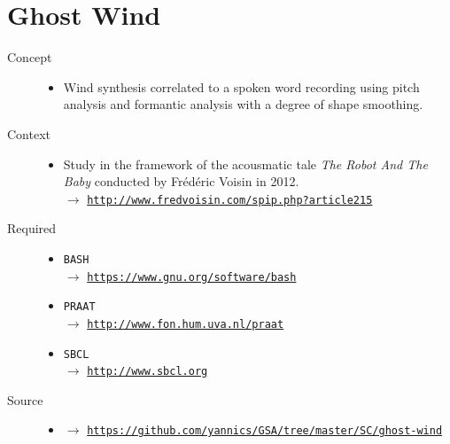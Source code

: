 

\section*{Ghost Wind}

\thispagestyle{empty}

\bigskip

\begin{description}
\item[Concept] \hfill 
\begin{itemize}
\item[] Wind synthesis correlated to a spoken word recording using pitch analysis and formantic analysis with a degree of shape smoothing.
\end{itemize}
\bigskip
\item[Context] \hfill 
\begin{itemize}
\item[] Study in the framework of the acousmatic tale \textit{The Robot And The Baby} conducted by Fr\'{e}d\'{e}ric Voisin in 2012. \\
$\rightarrow$ \href{http://www.fredvoisin.com/spip.php?article215}{\texttt{\small http://www.fredvoisin.com/spip.php?article215}}
\end{itemize}
\bigskip
\item[Required] \hfill 
\begin{itemize}
\setlength\itemsep{1em}
\item[] \texttt{BASH} \\ $\rightarrow$ \href{https://www.gnu.org/software/bash}{\texttt{\small https://www.gnu.org/software/bash}}
\item[] \texttt{PRAAT} \\ $\rightarrow$ \href{http://www.fon.hum.uva.nl/praat}{\texttt{\small http://www.fon.hum.uva.nl/praat}} 
\item[] \texttt{SBCL} \\ $\rightarrow$ \href{http://www.sbcl.org}{\texttt{\small http://www.sbcl.org}}
\end{itemize}
\bigskip
\item[Source] \hfill 
\begin{itemize}
\item[] $\rightarrow$ \href{https://github.com/yannics/GSA/tree/master/SC/ghost-wind}{\texttt{\small https://github.com/yannics/GSA/tree/master/SC/ghost-wind}} 

\end{itemize}
\end{description}
